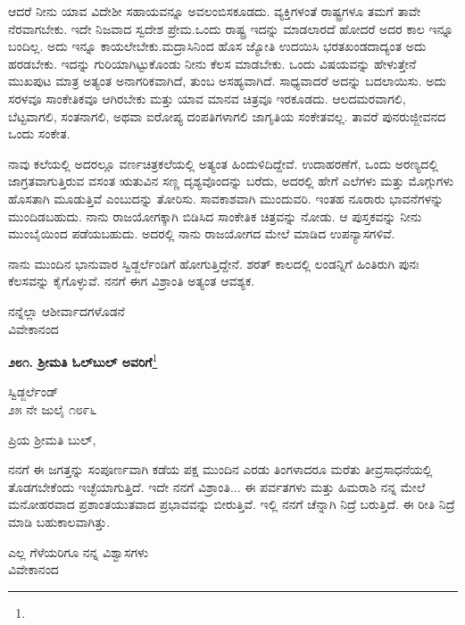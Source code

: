 \vspace{0.1cm}

ಆದರೆ ನೀನು ಯಾವ ವಿದೇಶೀ ಸಹಾಯವನ್ನೂ ಅವಲಂಬಿಸಕೂಡದು. ವ್ಯಕ್ತಿಗಳಂತೆ ರಾಷ್ಟ್ರಗಳೂ ತಮಗೆ ತಾವೇ ನೆರವಾಗಬೇಕು. ಇದೇ ನಿಜವಾದ ಸ್ವದೇಶ ಪ್ರೇಮ.ಒಂದು ರಾಷ್ಟ್ರ ಇದನ್ನು ಮಾಡಲಾರದೆ ಹೋದರೆ ಅದರ ಕಾಲ ಇನ್ನೂ ಬಂದಿಲ್ಲ. ಅದು ಇನ್ನೂ ಕಾಯಲೇಬೇಕು.ಮದ್ರಾಸಿನಿಂದ ಹೊಸ ಜ್ಯೋತಿ ಉದಯಿಸಿ ಭರತಖಂಡದಾದ್ಯಂತ ಅದು ಹರಡಬೇಕು. ಇದನ್ನು ಗುರಿಯಾಗಿಟ್ಟುಕೊಂಡು ನೀನು ಕೆಲಸ ಮಾಡಬೇಕು. ಒಂದು ವಿಷಯವನ್ನು ಹೇಳುತ್ತೇನೆ\enginline{-} ಮುಖಪುಟ ಮಾತ್ರ ಅತ್ಯಂತ ಅನಾಗರಿಕವಾಗಿದೆ, ತುಂಬ ಅಸಹ್ಯವಾಗಿದೆ. ಸಾಧ್ಯವಾದರೆ ಅದನ್ನು ಬದಲಾಯಿಸು. ಅದು ಸರಳವೂ ಸಾಂಕೇತಿಕವೂ ಆಗಿರಬೇಕು ಮತ್ತು ಯಾವ ಮಾನವ ಚಿತ್ರವೂ ಇರಕೂಡದು. ಆಲದಮರವಾಗಲಿ, ಬೆಟ್ಟವಾಗಲಿ, ಸಂತನಾಗಲಿ, ಅಥವಾ ಐರೋಪ್ಯ ದಂಪತಿಗಳಾಗಲಿ ಜಾಗೃತಿಯ ಸಂಕೇತವಲ್ಲ. ತಾವರೆ ಪುನರುಜ್ಜೀವನದ ಒಂದು ಸಂಕೇತ.

\vspace{0.1cm}

ನಾವು ಕಲೆಯಲ್ಲಿ ಅದರಲ್ಲೂ ವರ್ಣಚಿತ್ರಕಲೆಯಲ್ಲಿ ಅತ್ಯಂತ ಹಿಂದುಳಿದಿದ್ದೇವೆ. ಉದಾಹರಣೆಗೆ, ಒಂದು ಅರಣ್ಯದಲ್ಲಿ ಜಾಗ್ರತವಾಗುತ್ತಿರುವ ವಸಂತ ಋತುವಿನ ಸಣ್ಣ ದೃಶ್ಯವೊಂದನ್ನು ಬರೆದು, ಅದರಲ್ಲಿ ಹೇಗೆ ಎಲೆಗಳು ಮತ್ತು ಮೊಗ್ಗುಗಳು ಹೊಸತಾಗಿ ಮೂಡುತ್ತಿವೆ ಎಂಬುದನ್ನು ತೋರಿಸು. ಸಾವಕಾಶವಾಗಿ ಮುಂದುವರಿ. ಇಂತಹ ನೂರಾರು ಭಾವನೆಗಳನ್ನು ಮುಂದಿಡಬಹುದು. ನಾನು ರಾಜಯೋಗಕ್ಕಾಗಿ ಬಿಡಿಸಿದ ಸಾಂಕೇತಿಕ ಚಿತ್ರವನ್ನು ನೋಡು. ಆ ಪುಸ್ತಕವನ್ನು ನೀನು ಮುಂಬೈಯಿಂದ ಪಡೆಯಬಹುದು. ಅದರಲ್ಲಿ ನಾನು ರಾಜಯೋಗದ ಮೇಲೆ ಮಾಡಿದ ಉಪನ್ಯಾಸಗಳಿವೆ.

\vspace{0.1cm}

ನಾನು ಮುಂದಿನ ಭಾನುವಾರ ಸ್ವಿಡ್ಜರ್ಲೆಂಡಿಗೆ ಹೋಗುತ್ತಿದ್ದೇನೆ. ಶರತ್ ಕಾಲದಲ್ಲಿ ಲಂಡನ್ನಿಗೆ ಹಿಂತಿರುಗಿ ಪುನಃ ಕೆಲಸವನ್ನು ಕೈಗೊಳ್ಳುವೆ. ನನಗೆ ಈಗ ವಿಶ್ರಾಂತಿ ಅತ್ಯಂತ ಆವಶ್ಯಕ.

{\flushright
ನನ್ನೆಲ್ಲಾ ಆಶೀರ್ವಾದಗಳೊಡನೆ\\ವಿವೇಕಾನಂದ\par}

\begin{center}
\textbf{೨೮೧. ಶ‍್ರೀಮತಿ ಓಲ್‌ಬುಲ್‌ ಅವರಿಗೆ}\footnote{}
\end{center}

\begin{flushright}
ಸ್ವಿಡ್ಜರ್ಲೆಂಡ್\\೨೫ ನೇ ಜುಲೈ ೧೮೯೬
\end{flushright}

\noindent
ಪ್ರಿಯ ಶ‍್ರೀಮತಿ ಬುಲ್,

ನನಗೆ ಈ ಜಗತ್ತನ್ನು ಸಂಪೂರ್ಣವಾಗಿ ಕಡೆಯ ಪಕ್ಷ ಮುಂದಿನ ಎರಡು ತಿಂಗಳಾದರೂ ಮರೆತು ತೀವ್ರಸಾಧನೆಯಲ್ಲಿ ತೊಡಗಬೇಕೆಂದು ಇಚ್ಛೆಯಾಗುತ್ತಿದೆ. ಇದೇ ನನಗೆ ವಿಶ್ರಾಂತಿ... ಈ ಪರ್ವತಗಳು ಮತ್ತು ಹಿಮರಾಶಿ ನನ್ನ ಮೇಲೆ ಮನೋಹರವಾದ ಪ್ರಶಾಂತಯುತವಾದ ಪ್ರಭಾವವನ್ನು ಬೀರುತ್ತಿವೆ. ಇಲ್ಲಿ ನನಗೆ ಚೆನ್ನಾಗಿ ನಿದ್ರೆ ಬರುತ್ತಿದೆ. ಈ ರೀತಿ ನಿದ್ರೆ ಮಾಡಿ ಬಹುಕಾಲವಾಗಿತ್ತು.

{\flushright
ಎಲ್ಲ ಗೆಳೆಯರಿಗೂ ನನ್ನ ವಿಶ್ವಾಸಗಳು\\ವಿವೇಕಾನಂದ\par}

